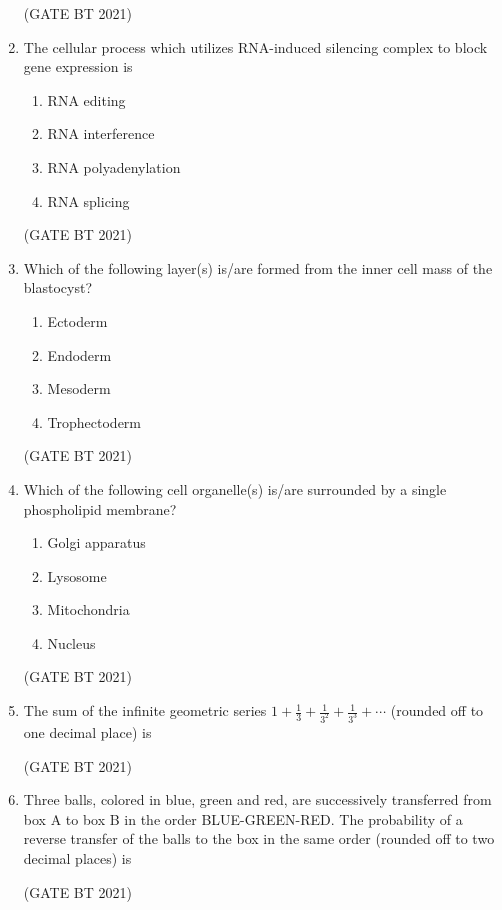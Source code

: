 \documentclass[journal,12pt,onecolumn]{IEEEtran}
\theoremstyle{remark}
\begin{document}
\begin{enumerate}
\hfill (GATE BT 2021)

\item The cellular process which utilizes RNA-induced silencing complex to block gene expression is

\begin{enumerate}
\item RNA editing
\item RNA interference
\item RNA polyadenylation
\item RNA splicing
\end{enumerate}

\hfill (GATE BT 2021)

\item Which of the following layer(s) is/are formed from the inner cell mass of the blastocyst?

\begin{enumerate}
\item Ectoderm
\item Endoderm
\item Mesoderm
\item Trophectoderm
\end{enumerate}

\hfill (GATE BT 2021)

\item Which of the following cell organelle(s) is/are surrounded by a single phospholipid membrane?

\begin{enumerate}
\item Golgi apparatus
\item Lysosome
\item Mitochondria
\item Nucleus
\end{enumerate}

\hfill (GATE BT 2021)

\item The sum of the infinite geometric series $1 + \frac{1}{3} + \frac{1}{3^2} + \frac{1}{3^3} + \cdots$ (rounded off to one decimal place) is

\hfill (GATE BT 2021)

\item Three balls, colored in blue, green and red, are successively transferred from box A to box B in the order BLUE-GREEN-RED. The probability of a reverse transfer of the balls to the box in the same order (rounded off to two decimal places) is

\hfill (GATE BT 2021)


\end{enumerate}
\end{document}
